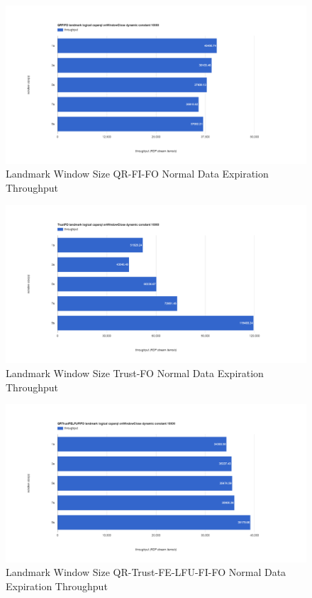 \begin{figure}[!htbp]
	\centering
    \includegraphics[width=\textwidth]{img/app3-land-ws-qrfifo-normal-t.png}
    \caption{Landmark Window Size QR-FI-FO Normal Data Expiration Throughput}
\end{figure}
\begin{figure}[!htbp]
	\centering
    \includegraphics[width=\textwidth]{img/app3-land-ws-trustfo-normal-t.png}
    \caption{Landmark Window Size Trust-FO Normal Data Expiration Throughput}
\end{figure}
\begin{figure}[!htbp]
	\centering
    \includegraphics[width=\textwidth]{img/app3-land-ws-qrtrustfelfufifo-normal-t.png}
    \caption{Landmark Window Size QR-Trust-FE-LFU-FI-FO Normal Data Expiration Throughput}
\end{figure}